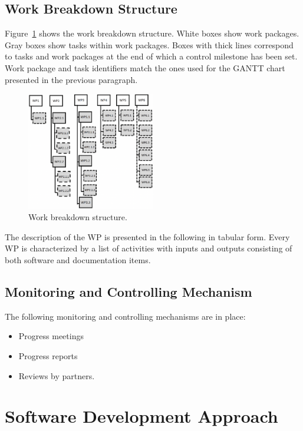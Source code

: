 \subsection{Work Breakdown Structure}

Figure~\ref{fig:work_breakdown} shows the work breakdown structure. White boxes show work packages. Gray boxes show tasks within work packages. Boxes with thick lines correspond to tasks and work packages at the end of which a control milestone has been set. Work package and task identifiers match the ones used for the GANTT chart presented in the previous paragraph.

\begin{figure}[H]
\caption{Work breakdown structure.}
\label{fig:work_breakdown}
\centering
\includegraphics[width=0.5\textwidth]{images/work_breakdown}
\end{figure}

The description of the WP is presented in the following in tabular form.
Every WP is characterized by a list of activities with inputs and outputs consisting of both software and documentation items.



\subsection{Monitoring and Controlling Mechanism}

The following monitoring and controlling mechanisms are in place:
\begin{itemize}
  \item Progress meetings
  \item Progress reports
  \item Reviews by partners.
\end{itemize}

\section{Software Development Approach}

